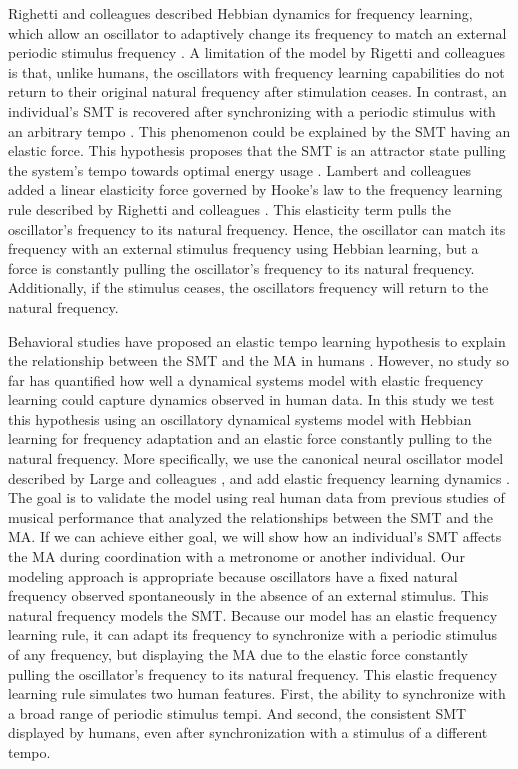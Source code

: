 \documentclass[10pt,letterpaper]{article}
\begin{document}
Righetti and colleagues described Hebbian dynamics for frequency learning, which allow an oscillator to adaptively change its frequency to match an external periodic stimulus frequency \cite{righetti2009adaptive}. A limitation of the model by Rigetti and colleagues is that, unlike humans, the oscillators with frequency learning capabilities do not return to their original natural frequency after stimulation ceases. In contrast, an individual's SMT is recovered after synchronizing with a periodic stimulus with an arbitrary tempo \cite{scheurich2018tapping}. This phenomenon could be explained by the SMT having an elastic force. This hypothesis proposes that the SMT is an attractor state pulling the system's tempo towards optimal energy usage \cite{mcauley2006time, scheurich2018tapping, strogatz1993coupled}. Lambert and colleagues added a linear elasticity force governed by Hooke's law to the frequency learning rule described by Righetti and colleagues \cite{lambert2016adaptive}. This elasticity term pulls the oscillator's frequency to its natural frequency. Hence, the oscillator can match its frequency with an external stimulus frequency using Hebbian learning, but a force is constantly pulling the oscillator's frequency to its natural frequency. Additionally, if the stimulus ceases, the oscillators frequency will return to the natural frequency.

Behavioral studies have proposed an elastic tempo learning hypothesis to explain the relationship between the SMT and the MA in humans \cite{scheurich2018tapping}. However, no study so far has quantified how well a dynamical systems model with elastic frequency learning could capture dynamics observed in human data. In this study we test this hypothesis using an oscillatory dynamical systems model with Hebbian learning for frequency adaptation and an elastic force constantly pulling to the natural frequency. More specifically, we use the canonical neural oscillator model described by Large and colleagues \cite{large2010canonical}, and add elastic frequency learning dynamics \cite{righetti2009adaptive, lambert2016adaptive}. The goal is to validate the model using real human data from previous studies of musical performance that analyzed the relationships between the SMT and the MA. If we can achieve either goal, we will show how an individual's SMT affects the MA during coordination with a metronome or another individual. Our modeling approach is appropriate because oscillators have a fixed natural frequency observed spontaneously in the absence of an external stimulus. This natural frequency models the SMT. Because our model has an elastic frequency learning rule, it can adapt its frequency to synchronize with a periodic stimulus of any frequency, but displaying the MA due to the elastic force constantly pulling the oscillator's frequency to its natural frequency. This elastic frequency learning rule simulates two human features. First, the ability to synchronize with a broad range of periodic stimulus tempi. And second, the consistent SMT displayed by humans, even after synchronization with a stimulus of a different tempo.
\end{document}
